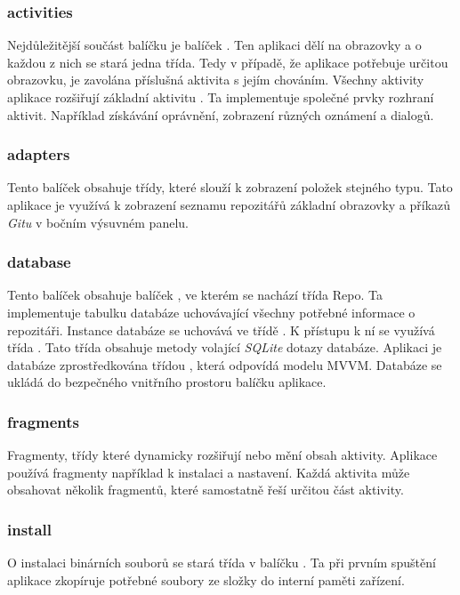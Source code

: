     \newpage
    \subsubsection{activities}
    Nejdůležitější součást balíčku  je balíček . Ten aplikaci dělí na obrazovky a o každou z nich se stará jedna třída. Tedy v případě, že aplikace potřebuje určitou obrazovku, je zavolána příslušná aktivita s jejím chováním. Všechny aktivity aplikace rozšiřují základní aktivitu . Ta implementuje společné prvky rozhraní aktivit. Například získávání oprávnění, zobrazení různých oznámení a dialogů.

    \subsubsection{adapters}
    Tento balíček obsahuje třídy, které slouží k zobrazení položek stejného typu. Tato aplikace je využívá k zobrazení seznamu repozitářů základní obrazovky a příkazů \emph{Gitu} v bočním výsuvném panelu.  

    \subsubsection{database}
    Tento balíček obsahuje balíček , ve kterém se nachází třída Repo. Ta implementuje tabulku databáze uchovávající všechny potřebné informace o repozitáři. Instance databáze se uchovává ve třídě . K přístupu k ní se využívá třída . Tato třída obsahuje metody volající \emph{SQLite} dotazy databáze. Aplikaci je databáze zprostředkována třídou , která odpovídá  modelu MVVM. Databáze se ukládá do bezpečného vnitřního prostoru balíčku aplikace.

    \subsubsection{fragments}
    Fragmenty, třídy které dynamicky rozšiřují nebo mění obsah aktivity. Aplikace používá fragmenty například k instalaci a nastavení. Každá aktivita může obsahovat několik fragmentů, které samostatně řeší určitou část aktivity.

    \subsubsection{install}
    O instalaci binárních souborů se stará třída  v balíčku . Ta při prvním spuštění aplikace zkopíruje potřebné soubory ze složky  do interní paměti zařízení.

